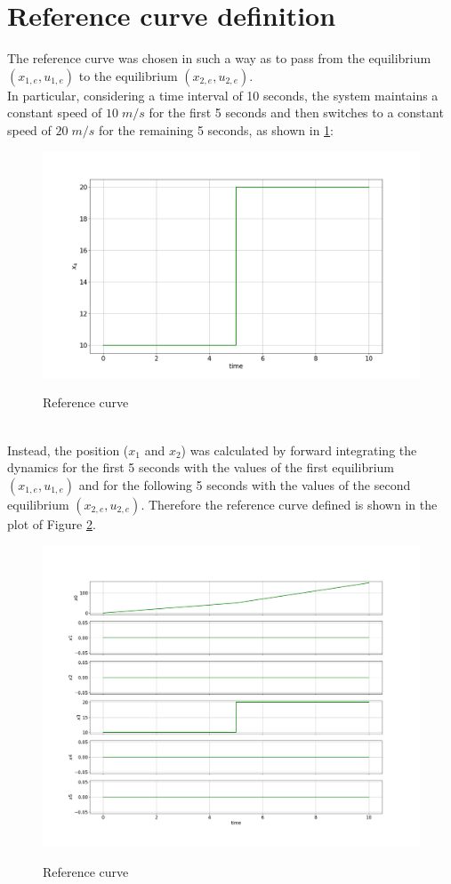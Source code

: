 \documentclass[a4paper,11pt,oneside]{book}
\begin{document}
\section{Reference curve definition}
The reference curve was chosen in such a way as to pass from the equilibrium $(x_{1,e}, u_{1,e})$ to the equilibrium $(x_{2,e}, u_{2,e})$.\\
In particular, considering a time interval of 10 seconds, the system maintains a constant speed of $10\;m/s$ for the first 5 seconds and then switches to a constant speed of $20\;m/s$ for the remaining 5 seconds, as shown in \ref{fig:ref_x4_task1}:
\begin{figure}[h]
    \centering
    \includegraphics[scale=.28]{figs/Task1/ref_x4} \\
    \caption{Reference curve}
    \label{fig:ref_x4_task1}
\end{figure}
\\
Instead, the position ($x_1$ and $x_2$) was calculated by forward integrating the dynamics for the first 5 seconds with the values of the first equilibrium $(x_{1,e}, u_{1,e})$ and for the following 5 seconds with the values of the second equilibrium $(x_{2,e}, u_{2,e})$. Therefore the reference curve defined is shown in the plot of Figure \ref{fig:ref_curve_task1}.\\
\begin{figure}[h]
    \centering
    \includegraphics[scale=.25]{figs/Task1/ref_curve} \\
    \caption{Reference curve}
    \label{fig:ref_curve_task1}
\end{figure}
\end{document}
